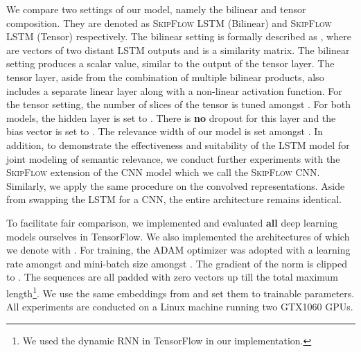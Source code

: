 \documentclass[letterpaper]{article}
\begin{document}
We compare two settings of our model, namely the bilinear and tensor composition. They are denoted as \textsc{SkipFlow} LSTM (Bilinear) and \textsc{SkipFlow} LSTM (Tensor) respectively. The bilinear setting is formally described as , where  are vectors of two distant LSTM outputs and  is a similarity matrix. The bilinear setting produces a scalar value, similar to the output of the tensor layer. The tensor layer, aside from the combination of multiple bilinear products, also includes a separate linear layer along with a non-linear activation function. For the tensor setting, the number of slices of the tensor is tuned amongst . For both models, the hidden layer is set to . There is \textbf{no} dropout for this layer and the bias vector is set to . The relevance width of our model  is set amongst . In addition, to demonstrate the effectiveness and suitability of the LSTM model for joint modeling of semantic relevance, we conduct further experiments with the \textsc{SkipFlow} extension of the CNN model which we call the \textsc{SkipFlow} CNN. Similarly, we apply the same procedure on the convolved representations. Aside from swapping the LSTM for a CNN, the entire architecture remains identical. 


To facilitate fair comparison, we implemented and evaluated \textbf{all} deep learning models ourselves in TensorFlow. We also implemented the architectures of \cite{DBLP:conf/emnlp/TaghipourN16} which we denote with . For training, the ADAM optimizer \cite{DBLP:journals/corr/KingmaB14} was adopted with a learning rate amongst  and mini-batch size amongst . The gradient of the norm is clipped to . The sequences are all padded with zero vectors up till the total maximum length\footnote{We used the dynamic RNN in TensorFlow in our implementation.}. We use the same embeddings from \cite{DBLP:conf/emnlp/TaghipourN16} and set them to trainable parameters. All experiments are conducted on a Linux machine running two GTX1060 GPUs. 
 
\end{document}
